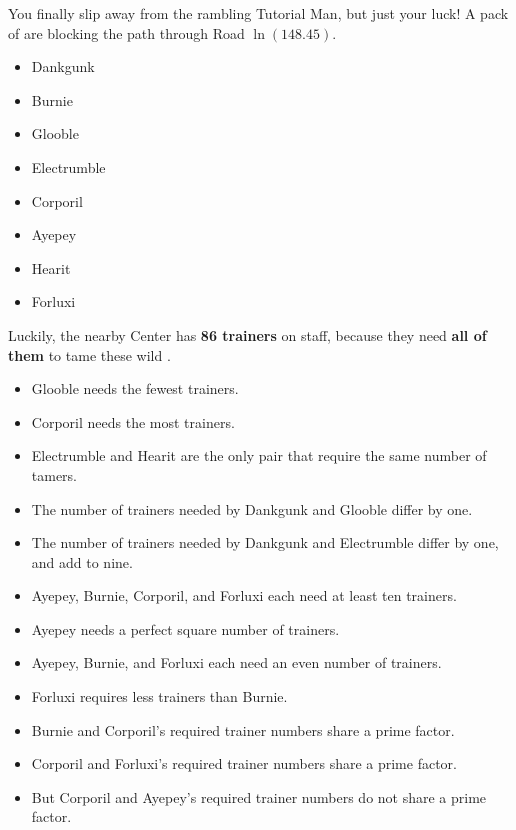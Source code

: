 

You finally slip away from the rambling Tutorial Man, but just your luck!
A pack of \mappMobimon{} are blocking the path
through Road \(\ln(148.45)\).

\begin{multicols}{2}
\begin{itemize}
  \item {Dankgunk}
  \item {Burnie}
  \item {Glooble}
  \item {Electrumble}
  \item {Corporil}
  \item {Ayepey}
  \item {Hearit}
  \item {Forluxi}
\end{itemize}
\end{multicols}

Luckily, the nearby \mappMobidash{} Center has \textbf{86 trainers} on staff,
because they need \textbf{all of them} to tame these wild \mappMobimon{}.

\begin{multicols}{2}
\begin{itemize}
\item Glooble needs the fewest trainers.
\item Corporil needs the most trainers.
\item Electrumble and Hearit are the only pair that require
      the same number of tamers.
\item The number of trainers needed by Dankgunk and Glooble differ by one.
\item The number of trainers needed by Dankgunk and Electrumble differ by one,
      and add to nine.
\item Ayepey, Burnie, Corporil, and Forluxi each need at least ten
      trainers.
\item Ayepey needs a perfect square number of trainers.
\item Ayepey, Burnie, and Forluxi each need an even number of trainers.
\item Forluxi requires less trainers than Burnie.
\item Burnie and Corporil's required trainer numbers share a prime factor.
\item Corporil and Forluxi's required trainer numbers share a prime factor.
\item But Corporil and Ayepey's required trainer numbers do not
      share a prime factor.
\end{itemize}
\end{multicols}


